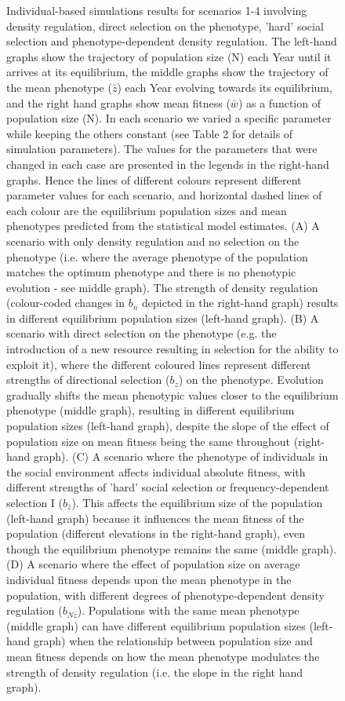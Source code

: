 \documentclass{article}
\begin{document}
\begin{figure} [H]
	\caption{Individual-based simulations results for scenarios 1-4 involving density regulation, direct selection on the phenotype, 'hard' social selection and phenotype-dependent density regulation. The left-hand graphs show the trajectory of population size (N) each Year until it arrives at its equilibrium, the middle graphs show the trajectory of the mean phenotype ($\bar{z}$) each Year evolving towards its equilibrium, and the right hand graphs show mean fitness ($\bar{w}$) as a function of population size (N). In each scenario we varied a specific parameter while keeping the others constant (see Table 2 for details of simulation parameters). The values for the parameters that were changed in each case are presented in the legends in the right-hand graphs. Hence the lines of different colours represent different parameter values for each scenario, and horizontal dashed lines of each colour are the equilibrium population sizes and mean phenotypes predicted from the statistical model estimates. (A) A scenario with only density regulation and no selection on the phenotype (i.e. where the average phenotype of the population matches the optimum phenotype and there is no phenotypic evolution - see middle graph). The strength of density regulation (colour-coded changes in $b_n$ depicted in the right-hand graph) results in different equilibrium population sizes (left-hand graph). (B) A scenario with direct selection on the phenotype (e.g. the introduction of a new resource resulting in selection for the ability to exploit it), where the different coloured lines represent different strengths of directional selection ($b_z$) on the phenotype. Evolution gradually shifts the mean phenotypic values closer to the equilibrium phenotype (middle graph), resulting in different equilibrium population sizes (left-hand graph), despite the slope of the effect of population size on mean fitness being the same throughout (right-hand graph). (C) A scenario where the phenotype of individuals in the social environment affects individual absolute fitness, with different strengths of 'hard' social selection or frequency-dependent selection I ($b_{\bar{z}}$). This affects the equilibrium size of the population (left-hand graph) because it influences the mean fitness of the population (different elevations in the right-hand graph), even though the equilibrium phenotype remains the same (middle graph). (D) A scenario where the effect of population size on average individual fitness depends upon the mean phenotype in the population, with different degrees of phenotype-dependent density regulation ($b_{N\bar{z}}$). Populations with the same mean phenotype (middle graph) can have different equilibrium population sizes (left-hand graph) when the relationship between population size and mean fitness depends on how the mean phenotype modulates the strength of density regulation (i.e. the slope in the right hand graph).}
	\label{fig:sim2}
\end{figure}
\end{document}
